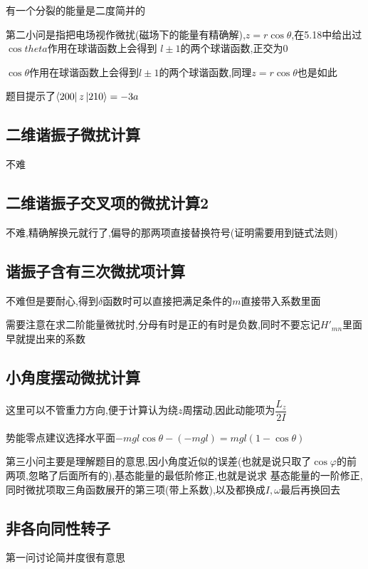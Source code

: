             有一个分裂的能量是二度简并的

            第二小问是指把电场视作微扰(磁场下的能量有精确解),$ z = r\cos{\theta} $,在5.18中给出过$\cos{theta}$作用在球谐函数上会得到
            $l \pm 1$的两个球谐函数,正交为0

            \begin{formal}
                $\cos{\theta}$作用在球谐函数上会得到$l \pm 1$的两个球谐函数,同理$z = r\cos{\theta}$也是如此
            \end{formal}

            题目提示了$ \bra{200} z \ket{210} = -3a $

        \subsection{二维谐振子微扰计算}
            不难
        
        \subsection{二维谐振子交叉项的微扰计算2}
            不难,精确解换元就行了,偏导的那两项直接替换符号(证明需要用到链式法则)
            
        \subsection{谐振子含有三次微扰项计算}
            不难但是要耐心,得到$\delta$函数时可以直接把满足条件的$m$直接带入系数里面

            需要注意在求二阶能量微扰时,分母有时是正的有时是负数,同时不要忘记$H'_{mn}$里面早就提出来的系数

        \subsection{小角度摆动微扰计算}
            这里可以不管重力方向,便于计算认为绕$z$周摆动,因此动能项为$\dfrac{L_{z}}{2I}$

            势能零点建议选择水平面$ -mgl\cos{\theta} - (-mgl) = mgl(1-\cos{\theta})$

            第三小问主要是理解题目的意思,因小角度近似的误差(也就是说只取了$\cos{\varphi}$的前两项,忽略了后面所有的),基态能量的最低阶修正,也就是说求
            基态能量的一阶修正,同时微扰项取三角函数展开的第三项(带上系数),以及都换成$I,\omega$最后再换回去

        \subsection{非各向同性转子}
            第一问讨论简并度很有意思

